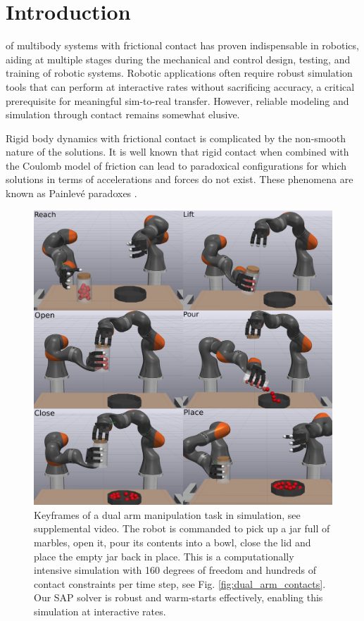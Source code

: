 \section{Introduction}
\label{sec:introduction}

 of multibody systems with frictional contact has
proven indispensable in robotics, aiding at multiple stages during the
mechanical and control design, testing, and training of robotic systems.
Robotic applications often require robust simulation tools that can perform at
interactive rates without sacrificing accuracy, a critical prerequisite for
meaningful sim-to-real transfer. However, reliable modeling and simulation
through contact remains somewhat elusive.

Rigid body dynamics with frictional contact is complicated by the non-smooth
nature of the solutions. It is well known \cite{bib:baraff1993issues} that rigid
contact when combined with the Coulomb model of friction can lead to paradoxical
configurations for which solutions in terms of accelerations and forces do not
exist. These phenomena are known as Painlev\'e paradoxes
\cite{bib:hogan2017regularization}.
%
\begin{figure}[!ht]
	\centering
    \includegraphics[width=0.95\columnwidth]{figures/dual_arm/tiled.png}
	\caption{\label{fig:dual_arm_frames}
    Keyframes of a dual arm manipulation task in simulation, see supplemental
    video. The robot is commanded to pick up a jar full of marbles, open it,
    pour its contents into a bowl, close the lid and place the empty jar back in
    place. This is a computationally intensive simulation with 160 degrees of
    freedom and hundreds of contact constraints per time step, see Fig.
    \ref{fig:dual_arm_contacts}. Our SAP solver is robust and warm-starts
    effectively, enabling this simulation at interactive rates.}
\end{figure}
